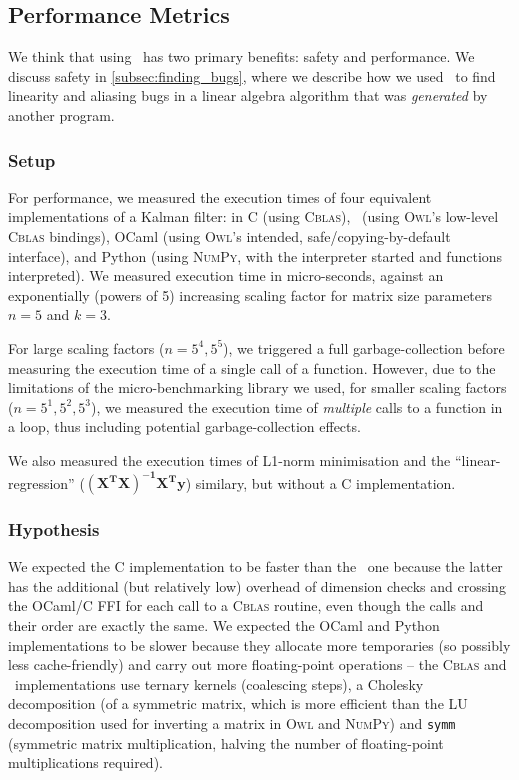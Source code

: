 \subsection{Performance Metrics}

We think that using \lang\ has two primary benefits: safety and performance. We
discuss safety in \ref{subsec:finding_bugs}, where we describe how we used
\lang\ to find linearity and aliasing bugs in a linear algebra algorithm that
was \emph{generated} by another program.

\subsubsection{Setup}

For performance, we measured the execution times of four equivalent
implementations of a Kalman filter: in C (using \textsc{Cblas}), \lang\ (using
\textsc{Owl}'s low-level \textsc{Cblas} bindings), OCaml (using \textsc{Owl}'s
intended, safe/copying-by-default interface), and Python (using \textsc{NumPy},
with the interpreter started and functions interpreted). We measured execution
time in micro-seconds, against an exponentially (powers of 5) increasing
scaling factor for matrix size parameters $n=5$ and $k=3$.

For large scaling factors ($n = 5^4, 5^5$), we triggered a full
garbage-collection before measuring the execution time of a single call of a
function. However, due to the limitations of the micro-benchmarking library we
used, for smaller scaling factors ($n = 5^1, 5^2, 5^3$), we measured the
execution time of \emph{multiple} calls to a function in a loop, thus including
potential garbage-collection effects.

We also measured the execution times of L1-norm minimisation and the
``linear-regression'' ($\mathbf{(X^T X)^{-1} X^T y}$) similary, but without a C
implementation.

\subsubsection{Hypothesis}

We expected the C implementation to be faster than the \lang\ one because the
latter has the additional (but relatively low) overhead of dimension checks and
crossing the OCaml/C FFI for each call to a \textsc{Cblas} routine, even though
the calls and their order are exactly the same. We expected the OCaml and
Python implementations to be slower because they allocate more temporaries (so
possibly less cache-friendly) and carry out more floating-point operations --
the \textsc{Cblas} and \lang\ implementations use ternary kernels (coalescing
steps), a Cholesky decomposition (of a symmetric matrix, which is more
efficient than the LU decomposition used for inverting a matrix in \textsc{Owl}
and \textsc{NumPy}) and \texttt{symm} (symmetric matrix multiplication, halving
the number of floating-point multiplications required).

